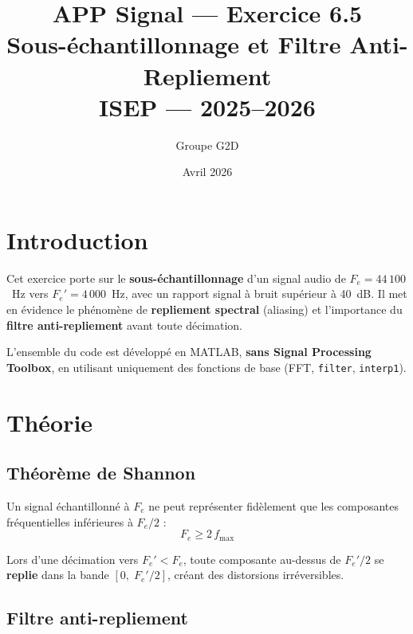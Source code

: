 \documentclass[12pt,a4paper]{article}
\title{
    \vspace{-1cm}
    \textbf{APP Signal --- Exercice 6.5} \\[0.3cm]
    \Large Sous-\'echantillonnage et Filtre Anti-Repliement \\[0.5cm]
    \large ISEP --- 2025--2026
}
\author{Groupe G2D}
\date{Avril 2026}
\begin{document}
\maketitle
\thispagestyle{fancy}
\tableofcontents
\newpage

\section{Introduction}

Cet exercice porte sur le \textbf{sous-\'echantillonnage} d'un signal audio de
$F_e = 44\,100$~Hz vers $F_e' = 4\,000$~Hz, avec un rapport signal \`a bruit
sup\'erieur \`a 40~dB. Il met en \'evidence le ph\'enom\`ene de
\textbf{repliement spectral} (aliasing) et l'importance du \textbf{filtre
anti-repliement} avant toute d\'ecimation.

L'ensemble du code est d\'evelopp\'e en MATLAB, \textbf{sans Signal Processing
Toolbox}, en utilisant uniquement des fonctions de base (FFT, \texttt{filter},
\texttt{interp1}).

\section{Th\'eorie}

\subsection{Th\'eor\`eme de Shannon}

Un signal \'echantillonn\'e \`a $F_e$ ne peut repr\'esenter fid\`element que
les composantes fr\'equentielles inf\'erieures \`a $F_e/2$ :
\begin{equation}
    F_e \geq 2\,f_{\max}
\end{equation}

Lors d'une d\'ecimation vers $F_e' < F_e$, toute composante au-dessus de
$F_e'/2$ se \textbf{replie} dans la bande $[0,\; F_e'/2]$, cr\'eant des
distorsions irr\'eversibles.

\subsection{Filtre anti-repliement}
\end{document}
